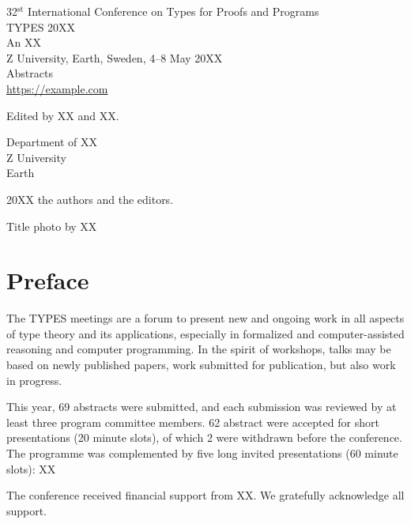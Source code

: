 \documentclass[a4paper,extrafontsizes,oneside]{memoir}
\begin{document}
32$^{\text{st}}$ International Conference on Types for Proofs and Programs \\
TYPES 20XX \\
An XX \\
Z University, Earth, Sweden, 4--8 May 20XX \\
Abstracts \\
\url{https://example.com}

\vspace{2\baselineskip}

Edited by XX and XX.

\vspace{2\baselineskip}

Department of XX \\
Z University \\
Earth \\

\vspace{4\baselineskip}

\textcopyright{} 20XX the authors and the editors.

\vspace{1\baselineskip}

Title photo by XX

\endgroup

\clearpage

\addtocounter{page}{-2}
\hypersetup{pageanchor=true}

\frontmatter

\chapter{Preface}

The TYPES meetings are a forum to present new and ongoing work in all aspects of type theory and its applications, especially in formalized and computer-assisted reasoning and computer programming.
In the spirit of workshops, talks may be based on newly published papers, work submitted for publication, but also work in progress.

This year, 69 abstracts were submitted, and each submission was reviewed by at least three program committee members.
62 abstract were accepted for short presentations (20 minute slots), of which 2 were withdrawn before the conference.
The programme was complemented by five long invited presentations (60 minute slots): XX

The conference received financial support from XX.
We gratefully acknowledge all support.
\end{document}
